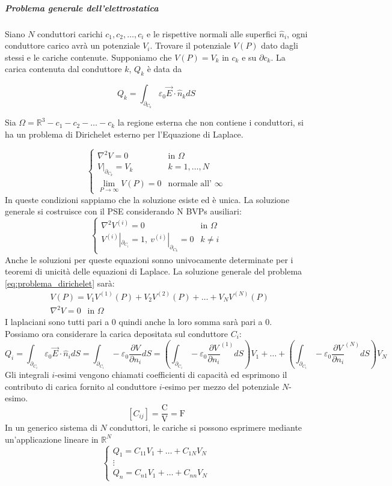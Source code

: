 \subparagraph{Problema generale dell'elettrostatica}

Siano $N$ conduttori carichi $c_1,c_2,\ldots ,c_i$ e le rispettive normali alle superfici
$\hat{n}_i$, ogni conduttore carico avrà un potenziale $V_i$. Trovare il potenziale $V(P)$ 
dato dagli stessi e le cariche contenute.
Supponiamo che $V(P) = V_k$ in $c_k$ e su $\partial c_k$.
La carica contenuta dal conduttore $k$, $Q_k$ è data da

$$
Q_k = \int_{\partial_{C_k}} \varepsilon_0 \vec{E}\cdot\hat{n}_k dS
$$

Sia $\Omega = \mathbb{R}^3 - c_1 - c_2 - \ldots  - c_k$ la regione esterna che non contiene i
conduttori, si ha un problema di Dirichelet esterno per l'Equazione di Laplace.

\begin{equation}
\begin{cases}
\nabla^2 V = 0 & \text{in } \Omega\\
V|_{\partial_{C_k}} = V_k & k=1,\ldots ,N \\
\lim_{P\to \infty}V(P)=0 & \text{normale all' } \infty
\end{cases}
\label{eq:problema_dirichelet}
\end{equation}
In queste condizioni sappiamo che la soluzione esiste ed è unica.
La soluzione generale si costruisce con il PSE considerando N BVPs ausiliari:
$$
\begin{cases}
\nabla^2 V^{(i)} = 0 &\text{in } \Omega\\
V^{(i)}|_{\partial_{C_i}} = 1,\ v^{(i)}|_{\partial_{C_k}} = 0 &  k \neq i
\end{cases}
$$
Anche le soluzioni per queste equazioni sonno univocamente determinate per i teoremi di unicità
delle equazioni di Laplace.
La soluzione generale del problema \ref{eq:problema_dirichelet} sarà:
\begin{align*}
&V(P) = V_1V^{(1)}(P) + V_2V^{(2)}(P) + \ldots  + V_NV^{(N)}(P) \\
& \nabla^2 V = 0 \ \ \text{ in }\Omega
\end{align*}
I laplaciani sono tutti pari a 0 quindi anche la loro somma sarà pari a 0.
Possiamo ora considerare la carica depositata sul conduttore $C_i$:
$$
Q_i = \int_{\partial_{C_i}} \varepsilon_0 \vec{E} \cdot \hat{n}_i dS = \int_{\partial_{C_i}} -\varepsilon_0 \frac{\partial V}{\partial n_i} dS = \left(\int_{\partial_{C_i}} - \varepsilon_0 \frac{\partial V}{\partial n_i}^{(1)} dS\right)V_1 + \ldots  + \left(\int_{\partial_{C_i}} - \varepsilon_0 \frac{\partial V}{\partial n_i}^{(N)} dS\right)V_N
$$
Gli integrali $i$-esimi vengono chiamati coefficienti di capacità ed esprimono il contributo
di carica fornito al conduttore $i$-esimo per mezzo del potenziale $N$-esimo.
$$
[C_{ij}] = \frac{\si{\coulomb}}{\si{\volt}} = \si{\farad}
$$
In un generico sistema di $N$ conduttori, le cariche si possono esprimere mediante
un'applicazione lineare in $\mathbb{R}^N$
$$
\begin{cases}
Q_1 = C_{11}V_1 + \ldots + C_{1N}V_N \\
\vdots \\
Q_n = C_{n1}V_1 + \ldots + C_{nn}V_N
\end{cases}
$$

